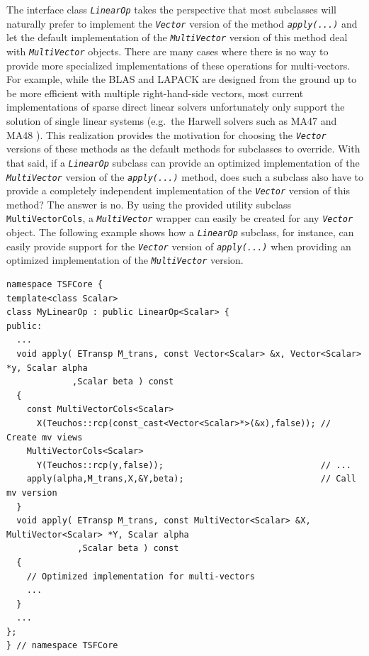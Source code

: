 The interface class \texttt{\textit{LinearOp}} takes the perspective
that most subclasses will naturally prefer to implement the
\texttt{\textit{Vector}} version of the method
\texttt{\textit{apply(\-...)}} and let the default implementation of the
\texttt{\textit{Multi\-Vector}} version of this method deal with
\texttt{\textit{Multi\-Vector}} objects.  There are many cases where there is no
way to provide more specialized implementations of these operations
for multi-vectors.  For example, while the BLAS and LAPACK are
designed from the ground up to be more efficient with multiple
right-hand-side vectors, most current implementations of sparse direct
linear solvers unfortunately only support the solution of single
linear systems (e.g.~the Harwell solvers such as MA47 and MA48
\cite{ref:hsl_1995}).  This realization provides the motivation for
choosing the \texttt{\textit{Vector}} versions of these methods as the
default methods for subclasses to override.  With that said, if a
\texttt{\textit{LinearOp}} subclass can
provide an optimized implementation of the \texttt{\textit{Multi\-Vector}}
version of the \texttt{\textit{apply(\-...)}} method, does such a subclass
also have to provide a completely independent implementation of the
\texttt{\textit{Vector}} version of this method?  The answer is no.
By using the provided utility subclass
\texttt{MultiVectorCols}, a \texttt{\textit{Multi\-Vector}} wrapper can
easily be created for any \texttt{\textit{Vector}} object.  The
following example shows how a
\texttt{\textit{LinearOp}} subclass, for instance, can easily provide
support for the \texttt{\textit{Vector}} version of
\texttt{\textit{apply(\-...)}} when providing an optimized
implementation of the \texttt{\textit{Multi\-Vector}} version.

{\scriptsize\begin{verbatim}
namespace TSFCore {
template<class Scalar>
class MyLinearOp : public LinearOp<Scalar> {
public:
  ...
  void apply( ETransp M_trans, const Vector<Scalar> &x, Vector<Scalar> *y, Scalar alpha
             ,Scalar beta ) const
  {
    const MultiVectorCols<Scalar>
      X(Teuchos::rcp(const_cast<Vector<Scalar>*>(&x),false)); // Create mv views
    MultiVectorCols<Scalar>
      Y(Teuchos::rcp(y,false));                               // ...
    apply(alpha,M_trans,X,&Y,beta);                           // Call mv version
  }
  void apply( ETransp M_trans, const MultiVector<Scalar> &X, MultiVector<Scalar> *Y, Scalar alpha
              ,Scalar beta ) const
  {
    // Optimized implementation for multi-vectors
    ...
  }
  ...
};
} // namespace TSFCore
\end{verbatim}}

